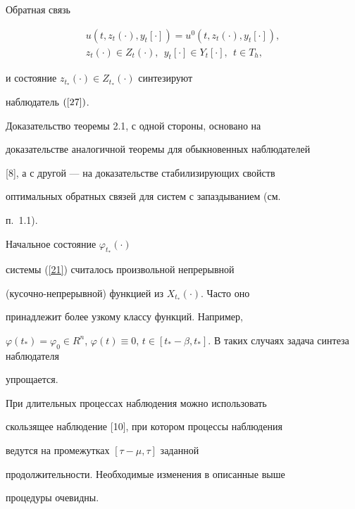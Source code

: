 \begin{thms}


Обратная связь


\begin{gather*}


u(t,z_{t}(\cdot), y_{t}[\cdot])=u^0(t,z_{t}(\cdot),y_{t}[\cdot]), \\


%


z_{t}(\cdot) \in Z_{t}(\cdot),\ \ y_{t}[\cdot] \in Y_{t}[\cdot],


\ \ t\in T_{h},


\end{gather*}


и состояние $z_{t_*}(\cdot) \in Z_{t_*}(\cdot)$ синтезируют


наблюдатель $(\ref{27})$.


\end{thms}





Доказательство теоремы 2.1, с одной стороны, основано на


доказательстве аналогичной теоремы для обыкновенных наблюдателей


[8], а с другой --- на доказательстве стабилизирующих свойств


оптимальных обратных связей для систем с запаздыванием (см.


п.~1.1).





\begin{notes}


Начальное состояние $\varphi_{t_*}(\cdot)$


системы (\ref{21}) считалось произвольной непрерывной


(кусочно-непрерывной) функцией из $X_{t_*}(\cdot)$. Часто оно


принадлежит более узкому классу функций. Например,


$\varphi(t_*)=\varphi_{0} \in R^n$, $\varphi(t) \equiv 0$, $t \in


[t_*-\beta, t_*]$. \tts{[} В таких случаях задача синтеза наблюдателя


упрощается.


\end{notes}





\begin{notes}


При длительных процессах наблюдения можно использовать


скользящее наблюдение [10], при котором процессы наблюдения


ведутся на промежутках $[\tau-\mu, \tau]$ заданной


продолжительности. Необходимые изменения в описанные выше


процедуры очевидны.


\end{notes}





